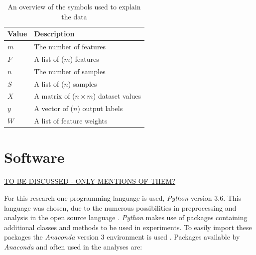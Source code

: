 \documentclass[10pt,a4paper]{report}
\begin{document}
	\begin{table}[]
		\caption{An overview of the symbols used to explain the data}
		\label{tab:DatasetSymbols}
		\begin{tabular}{|l|l|}
			\hline
			\textbf{Value} & \textbf{Description}                                   \\ \hline
			$m$				 & The number of features                                 \\ \hline
			$F$              & A list of ($m$) features                                 \\ \hline
			$n$				 & The number of samples                                 \\ \hline
			$S$              & A list of ($n$) samples                                  \\ \hline
			$X$              & A matrix of ($n \times m$) dataset values \\ \hline
			$y$              & A vector of ($n$) output labels                          \\ \hline
			$W$              & A list of feature weights                              \\ \hline
		\end{tabular}
	\end{table}
	
		\section{Software} \underline{TO BE DISCUSSED - ONLY MENTIONS OF THEM?}
	\label{PLsec:Software}
	
	For this research one programming language is used, \textit{Python} version 3.6. This language was chosen, due to the numerous possibilities in preprocessing and analysis in the open source language \cite{mckinney2010data}. \textit{Python} makes use of packages containing additional classes and methods to be used in experiments. To easily import these packages the \textit{Anaconda} version 3 environment is used \cite{yan2018hands}. Packages available by \textit{Anaconda} and often used in the analyses are:
	
\end{document}

